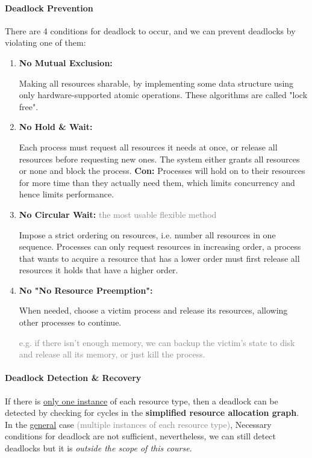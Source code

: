 \documentclass[openany,12pt]{book}
\newcommand{\gray}[1]{\textcolor{gray}{#1}}
\begin{document}
\paragraph{Deadlock Prevention} There are 4 conditions for deadlock to occur, and we can prevent deadlocks by violating one of them:
\begin{enumerate}
    \item \textbf{No Mutual Exclusion:} \par
          Making all resources sharable, by implementing some data structure using only hardware-supported atomic operations. These algorithms are called "lock free".

    \item \textbf{No Hold \& Wait:} \par
          Each process must request all resources it needs at once, or release all resources before requesting new ones. The system either grants all resources or none and block the process.
          \textbf{Con:} Processes will hold on to their resources for more time than they actually need them, which limits concurrency and hence limits performance.

    \item \textbf{No Circular Wait:} \gray{the most usable flexible method} \par
          Impose a strict ordering on resources, i.e. number all resources in one sequence. Processes can only request resources in increasing order, a process that wants to acquire a resource that has a lower order must first release all resources it holds that have a higher order.

    \item \textbf{No "No Resource Preemption":} \par
          When needed, choose a victim process and release its resources, allowing other processes to continue. \par
          \gray{e.g. if there isn't enough memory, we can backup the victim's state to disk and release all its memory, or just kill the process.}

\end{enumerate}

\paragraph{Deadlock Detection \& Recovery} If there is \ul{only one instance} of each resource type, then a deadlock can be detected by checking for cycles in the \textbf{simplified resource allocation graph}. In the \ul{general} case \gray{(multiple instances of each resource type)}, Necessary conditions for deadlock are not sufficient, nevertheless, we can still detect deadlocks but it is \textit{outside the scope of this course}. \par
\end{document}
